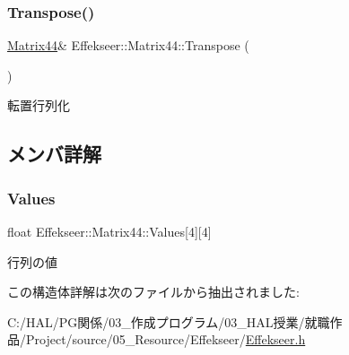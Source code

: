 \subsubsection{\texorpdfstring{Transpose()}{Transpose()}}
{\footnotesize\ttfamily \mbox{\hyperlink{struct_effekseer_1_1_matrix44}{Matrix44}}\& Effekseer\+::\+Matrix44\+::\+Transpose (\begin{DoxyParamCaption}{ }\end{DoxyParamCaption})}



転置行列化 



\subsection{メンバ詳解}
\mbox{\label{struct_effekseer_1_1_matrix44_ac747413302e165521317a399db929313}} 
\subsubsection{\texorpdfstring{Values}{Values}}
{\footnotesize\ttfamily float Effekseer\+::\+Matrix44\+::\+Values\mbox{[}4\mbox{]}\mbox{[}4\mbox{]}}



行列の値 



この構造体詳解は次のファイルから抽出されました\+:\begin{DoxyCompactItemize}
\item 
C\+:/\+H\+A\+L/\+P\+G関係/03\+\_\+作成プログラム/03\+\_\+\+H\+A\+L授業/就職作品/\+Project/source/05\+\_\+\+Resource/\+Effekseer/\mbox{\hyperlink{_effekseer_8h}{Effekseer.\+h}}\end{DoxyCompactItemize}
